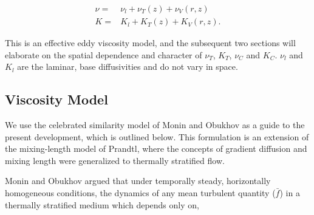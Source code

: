 \begin{eqnarray*}
 \nu =& \nu_{l} + \nu_{T}(z) + \nu_{V}(r,z) \\
 K =& K_{l} + K_{T}(z) + K_{V}(r,z).
\end{eqnarray*}

This is an effective eddy viscosity model, and the subsequent two
sections will elaborate on the spatial dependence and character of
$\nu_T$, $K_T$, $\nu_C$ and $K_C$. $\nu_l$ and $K_l$ are the laminar,
base diffusivities and do not vary in space. 

\subsection{Viscosity Model}

We use the celebrated similarity model of Monin and
Obukhov\cite{monin2007statistical,monin1954basic} as a guide to the
present development, which is outlined below. This formulation is an
extension of the mixing-length model of Prandtl, where the concepts of
gradient diffusion and mixing length were generalized to thermally
stratified flow.   

%
%

Monin and Obukhov argued that under temporally steady, horizontally
homogeneous conditions, the dynamics of any mean turbulent quantity
($\bar f$) in a thermally stratified medium which depends only on,  

